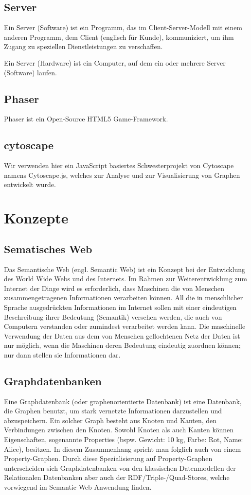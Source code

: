 \documentclass[11pt,a4paper]{article}
\begin{document}
\subsection{Server}
Ein Server (Software) ist ein Programm, das im Client-Server-Modell mit einem anderen Programm, dem Client (englisch für Kunde), kommuniziert, um ihm Zugang zu speziellen Dienstleistungen zu verschaffen. \par\bigskip

Ein Server (Hardware) ist ein Computer, auf dem ein oder mehrere Server (Software) laufen.

\subsection{Phaser}
Phaser ist ein Open-Source HTML5 Game-Framework.

\subsection{cytoscape}
Wir verwenden hier ein JavaScript basiertes Schwesterprojekt von Cytoscape namens Cytoscape.js, welches zur Analyse und zur Visualisierung von Graphen entwickelt wurde.


\section{Konzepte}
\subsection{Sematisches Web}
Das Semantische Web (engl. Semantic Web) ist ein Konzept bei der Entwicklung des World Wide Webs und des   Internets. Im Rahmen zur Weiterentwicklung zum Internet der Dinge wird es erforderlich, dass Maschinen die von   Menschen  zusammengetragenen Informationen verarbeiten können. All die   in  menschlicher Sprache ausgedrückten Informationen im Internet sollen   mit  einer eindeutigen Beschreibung ihrer Bedeutung (Semantik)   versehen  werden, die auch von Computern verstanden oder zumindest   verarbeitet  werden kann. Die maschinelle Verwendung der Daten aus dem   von Menschen  geflochtenen Netz der Daten ist nur möglich, wenn die   Maschinen deren  Bedeutung eindeutig zuordnen können; nur dann stellen   sie Informationen  dar.

\subsection{Graphdatenbanken}
Eine Graphdatenbank (oder graphenorientierte Datenbank) ist eine Datenbank, die Graphen benutzt, um stark vernetzte Informationen darzustellen und abzuspeichern. Ein solcher Graph besteht aus Knoten und Kanten, den Verbindungen zwischen den Knoten. Sowohl Knoten als auch Kanten können Eigenschaften, sogenannte Properties (bspw. Gewicht: 10 kg, Farbe: Rot, Name: Alice), besitzen. In diesem Zusammenhang spricht man folglich auch von einem Property-Graphen. Durch diese Spezialisierung auf Property-Graphen unterscheiden sich Graphdatenbanken von den klassischen Datenmodellen der Relationalen Datenbanken aber auch der RDF/Triple-/Quad-Stores, welche vorwiegend im Semantic Web Anwendung finden.
\end{document}
